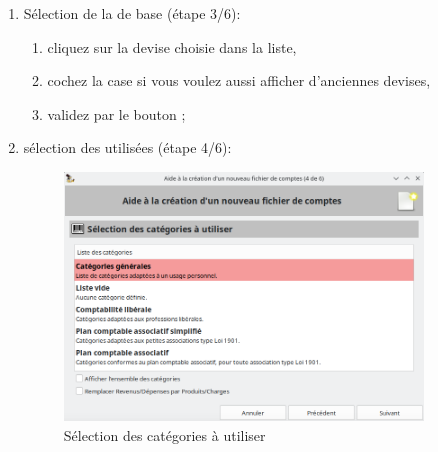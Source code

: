 \begin{enumerate}
\begin{enumerate}
			\item sélectionnez le  avec l'un des quatre boutons :
			\begin{addmargin}{-0.2cm}
				\begin{itemize}	
				\item "dd/mm/yyyy" pour "jour/mois/année",
				\item "mm/dd/yyyy" pour "mois/jour/année",
				\item "dd.mm.yyyy" pour "jour.mois.année",
				\item "yyyy-mm-dd" pour "année-mois-jour",
				\end{itemize}
			\end{addmargin}
			\item choisissez le  décimal et celui des milliers dans les listes déroulantes,
			 \item renseignez l'adresse (facultatif),
			 \item  validez par le bouton  ;
		\end{enumerate}
		
	\item Sélection de la  de base (étape 3/6):
		\begin{enumerate} 
		 	\item cliquez sur la devise choisie dans la liste,
			\item cochez la case  si vous voulez aussi afficher d'anciennes devises,
			\item validez par le bouton ;
		\end{enumerate}

	\item sélection des  utilisées (étape 4/6):
	
	\begin{figure}[htbp]
	\begin{center}
		\includegraphics[width=0.9\textwidth]{image/screenshot/start_category_select}
	\end{center}
	\caption{Sélection des catégories à utiliser}
	\label{start_category_select}
	\end{figure}
		

\end{enumerate}
